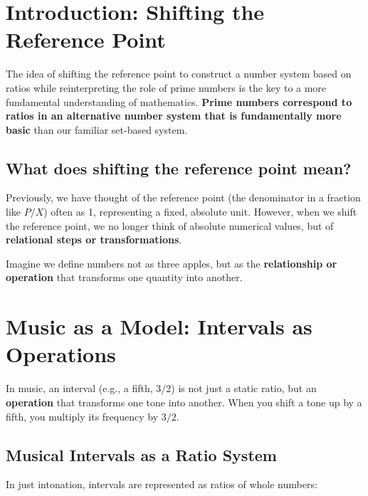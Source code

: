 \documentclass[11pt,a4paper]{article}
\begin{document}
	\newpage
	
	\section{Introduction: Shifting the Reference Point}
	
	The idea of shifting the reference point to construct a number system based on ratios while reinterpreting the role of prime numbers is the key to a more fundamental understanding of mathematics. \textbf{Prime numbers correspond to ratios in an alternative number system that is fundamentally more basic} than our familiar set-based system.
	
	\subsection{What does shifting the reference point mean?}
	
	Previously, we have thought of the reference point (the denominator in a fraction like $P/X$) often as 1, representing a fixed, absolute unit. However, when we shift the reference point, we no longer think of absolute numerical values, but of \textbf{relational steps or transformations}.
	
	Imagine we define numbers not as three apples, but as the \textbf{relationship or operation} that transforms one quantity into another.
	
	\section{Music as a Model: Intervals as Operations}
	
	In music, an interval (e.g., a fifth, $3/2$) is not just a static ratio, but an \textbf{operation} that transforms one tone into another. When you shift a tone up by a fifth, you multiply its frequency by $3/2$.
	
	\subsection{Musical Intervals as a Ratio System}
	
	In just intonation, intervals are represented as ratios of whole numbers:
	
\end{document}
